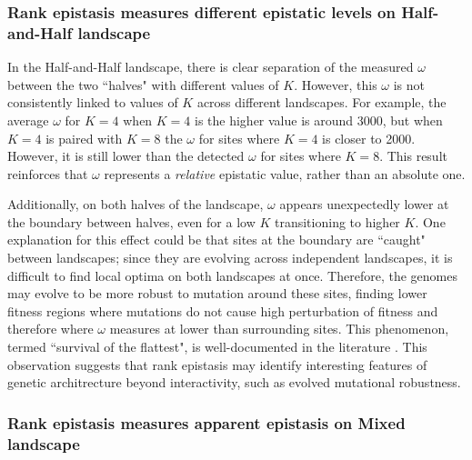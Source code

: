 \subsubsection{Rank epistasis measures different epistatic levels on Half-and-Half landscape}

In the Half-and-Half landscape, there is clear separation of the measured $\omega$ between the two ``halves" with different values of $K$. However, this $\omega$ is not consistently linked to values of $K$ across different landscapes. For example, the average $\omega$ for $K=4$ when $K=4$ is the higher value is around 3000, but when $K=4$ is paired with $K=8$ the $\omega$ for sites where $K=4$ is closer to 2000. However, it is still lower than the detected $\omega$ for sites where $K=8$. This result reinforces that $\omega$ represents a \textit{relative} epistatic value, rather than an absolute one. 

Additionally, on both halves of the landscape, $\omega$ appears unexpectedly lower at the boundary between halves, even for a low $K$ transitioning to higher $K$. One explanation for this effect could be that sites at the boundary are ``caught" between landscapes; since they are evolving across independent landscapes, it is difficult to find local optima on both landscapes at once. Therefore, the genomes may evolve to be more robust to mutation around these sites, finding lower fitness regions where mutations do not cause high perturbation of fitness and therefore where $\omega$ measures at lower than surrounding sites. This phenomenon, termed ``survival of the flattest", is well-documented in the literature \citep{wilke_evolution_2001, franklin_mapping_2019}. This observation suggests that rank epistasis may identify interesting features of genetic architrecture beyond interactivity, such as evolved mutational robustness.

\subsubsection{Rank epistasis measures apparent epistasis on Mixed landscape}

